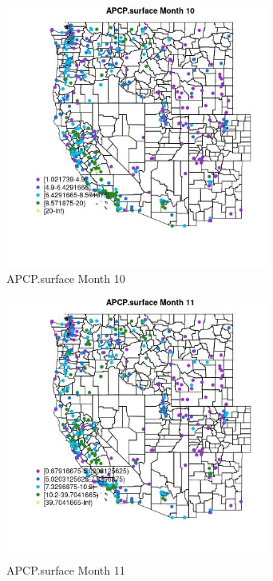 \begin{figure} 
\centering  
\includegraphics[width=0.77\textwidth]{Code_Outputs/ML_input_report_ML_input_PM25_Step5_part_d_de_duplicated_aves_ML_input_MapObsMo10APCPsurface.jpg} 
\caption{\label{fig:ML_input_report_ML_input_PM25_Step5_part_d_de_duplicated_aves_ML_inputMapObsMo10APCPsurface}APCP.surface Month 10} 
\end{figure} 
 

\begin{figure} 
\centering  
\includegraphics[width=0.77\textwidth]{Code_Outputs/ML_input_report_ML_input_PM25_Step5_part_d_de_duplicated_aves_ML_input_MapObsMo11APCPsurface.jpg} 
\caption{\label{fig:ML_input_report_ML_input_PM25_Step5_part_d_de_duplicated_aves_ML_inputMapObsMo11APCPsurface}APCP.surface Month 11} 
\end{figure} 
 

